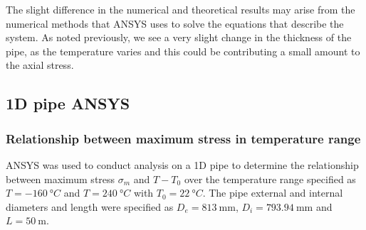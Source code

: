 The slight difference in the numerical and theoretical results may arise from the numerical methods that ANSYS uses to solve the equations that describe the system. As noted previously, we see a very slight change in the thickness of the pipe, as the temperature varies and this could be contributing a small amount to the axial stress.
\subsection{1D pipe ANSYS}\label{part1d}
\subsubsection{Relationship between maximum stress in temperature range}
ANSYS was used to conduct analysis on a 1D pipe to determine the relationship between maximum stress $\sigma_m$ and $T-T_0$ over the temperature range specified as $T = \SI{-160}{\degree C}$ and $T = \SI{240}{\degree C}$ with $T_0 = \SI{22}{\degree C}$. The pipe external and internal diameters and length were specified as $D_e = \SI{813}{\milli\meter}$, $D_i = \SI{793.94}{\milli\meter}$ and $L = \SI{50}{\meter}$.

